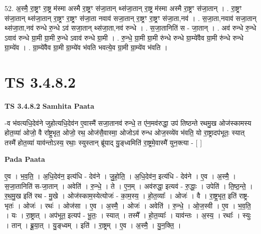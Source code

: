 \documentclass[17pt]{extarticle}
\begin{document}
52. अ॒स्मै॒ रा॒ष्ट्रꣳ रा॒ष्ट्र म॑स्मा अस्मै रा॒ष्ट्रꣳ स॑जा॒तान् थ्स॑जा॒तान् रा॒ष्ट्र म॑स्मा अस्मै रा॒ष्ट्रꣳ स॑जा॒तान् । . रा॒ष्ट्रꣳ स॑जा॒तान् थ्स॑जा॒तान् रा॒ष्ट्रꣳ रा॒ष्ट्रꣳ स॑जा॒ता नवाव॑ सजा॒तान् रा॒ष्ट्रꣳ रा॒ष्ट्रꣳ स॑जा॒ता,नव॑ । . स॒जा॒ता,नवाव॑ सजा॒तान् थ्स॑जा॒ता,नव॑ रुन्धे रु॒न्धे ऽव॑ सजा॒तान् थ्स॑जा॒ता,नव॑ रुन्धे । . स॒जा॒तानिति॑ स - जा॒तान् । . अव॑ रुन्धे रु॒न्धे ऽवाव॑ रुन्धे ग्रा॒मी ग्रा॒मी रु॒न्धे ऽवाव॑ रुन्धे ग्रा॒मी । . रु॒न्धे॒ ग्रा॒मी ग्रा॒मी रु॑न्धे रुन्धे ग्रा॒म्ये॑वैव ग्रा॒मी रु॑न्धे रुन्धे ग्रा॒म्ये॑व । . ग्रा॒म्ये॑वैव ग्रा॒मी ग्रा॒म्ये॑व भ॑वति भवत्ये॒व ग्रा॒मी ग्रा॒म्ये॑व भ॑वति । \newline
\pagebreak
{}

\section{ TS 3.4.8.2 }

\textbf{TS 3.4.8.2 } \newline
\textbf{Samhita Paata} \newline

-व भ॑वत्यधि॒देव॑ने जुहोत्यधि॒देव॑न ए॒वास्मै॑ सजा॒तानव॑ रुन्धे॒ त ए॑न॒मव॑रुद्धा॒ उप॑ तिष्ठन्ते रथमु॒ख ओज॑स्कामस्य होत॒व्या॑ ओजो॒ वै रा᳚ष्ट्र॒भृत॒ ओजो॒ रथ॒ ओज॑सै॒वास्मा॒ ओजोऽव॑ रुन्ध ओज॒स्व्ये॑व भ॑वति॒ यो रा॒ष्ट्रादप॑भूतः॒ स्यात् तस्मै॑ होत॒व्या॑ याव॑न्तोऽस्य॒ रथाः॒ स्युस्तान् ब्रू॑याद् यु॒ङ्ध्वमिति॑ रा॒ष्ट्रमे॒वास्मै॑ युन॒क्त्या - [  ] \newline

\textbf{Pada Paata} \newline

ए॒व । भ॒व॒ति॒ । अ॒धि॒देव॑न॒ इत्य॑धि - देव॑ने । जु॒हो॒ति॒ । अ॒धि॒देव॑न॒ इत्य॑धि - देव॑ने । ए॒व । अ॒स्मै॒ । स॒जा॒तानिति॑ स-जा॒तान् । अवेति॑ । रु॒न्धे॒ । ते । ए॒न॒म् । अव॑रुद्धा॒ इत्यव॑ - रु॒द्धाः॒ । उपेति॑ । ति॒ष्ठ॒न्ते॒ । र॒थ॒मु॒ख इति॑ रथ - मु॒खे । ओज॑स्काम॒स्येत्योजः॑ - का॒म॒स्य॒ । हो॒त॒व्याः᳚ । ओजः॑ । वै । रा॒ष्ट्र॒भृत॒ इति॑ राष्ट्र-भृतः॑ । ओजः॑ । रथः॑ । ओज॑सा । ए॒व । अ॒स्मै॒ । ओजः॑ । अवेति॑ । रु॒न्धे॒ । ओ॒ज॒स्वी । ए॒व । भ॒व॒ति॒ । यः । रा॒ष्ट्रात् । अप॑भूत॒ इत्यप॑ - भू॒तः॒ । स्यात् । तस्मै᳚ । हो॒त॒व्याः᳚ । याव॑न्तः । अ॒स्य॒ । रथाः᳚ । स्युः । तान् । ब्रू॒या॒त् । यु॒ङ्ध्वम् । इति॑ । रा॒ष्ट्रम् । ए॒व । अ॒स्मै॒ । यु॒न॒क्ति॒ ।  \newline
\end{document}
